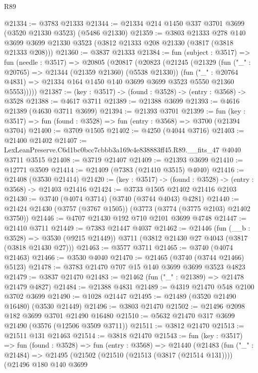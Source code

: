 \begin{lexlean}{R89}
\begin{coremodule}
@21334 := @3783 @21333
@21344 := @21334 @214 @1450 @337 @3701 @3699 (@3520 @21330 @3523) (@5486 @21330)
@21359 := @3803
    @21333
    @278
    @140
    @3699
    @3699
    @21330
    @3523
    (@3812 @21333 @208 @21330 (@3817 (@3818 @21333 @208)))
@21360 := @3837 @21333
@21384 := fun (subject : @3517) =>
  fun (needle : @3517) =>
  @20805
    (@20817
      (@20823
        (@21245
          (@21329
            (fun ("_" : @20765) => @21344 (@21359 @21360) (@5538 @21330))
            (fun ("_" : @20764 @4831) =>
            @21334 @164 @1450 @140 @3699 @3699 @3523 @5550 @21360 @5553)))))
@21387 := (key : @3517) -> (found : @3528) -> (entry : @3568) -> @3528
@21388 := @4617 @3711
@21389 := @21388 @3699
@21393 := @4616 @21389 (@4630 @3711 @3699)
@21394 := @21393 @3701
@21399 := fun (key : @3517) => fun (found : @3528) => fun (entry : @3568) => @3700 (@21394 @3704)
@21400 := @3709 @1505
@21402 := @4250 (@4044 @3716)
@21403 := @21400 @21402
@21407 := LexLeanPreserve.C6d1bc0bcc7cbbb3a169c4e838883ff45.R89.__fits_47 @4040 @3711 @3515
@21408 := @3719 @21407
@21409 := @21393 @3699
@21410 := @12771 @3509
@21414 := @21409 (@7383 (@21410 @3515) @4040)
@21416 := @21408 (@3530 @21414)
@21420 := (key : @3517) -> (found : @3528) -> (entry : @3568) -> @21403 @21416
@21424 := @3733 @1505 @21402 @21416 @2103
@21430 := @3740 (@4074 @3714) (@3740 (@3744 @4043) @4281)
@21440 := @21424 @21430 (@3757 (@3767 @1505)) (@3773 (@3774 (@3775 @2103) @21402 @3750))
@21446 := @4707 @21430 @192 @710 @2101 @3699 @4748
@21447 := @21410 @3711
@21449 := @7383 @21447 @4037
@21462 := @21446
    (fun (__b : @3528) => @3530 (@9215 @21449))
    @3711
    (@3812 @21430 @27 @4043 (@3817 (@3818 @21430 @27)))
@21463 := @3577 @3711
@21465 := @3740 (@4074 @21463)
@21466 := @3530 @4040
@21470 := @21465 (@3740 (@3744 @21466) @5123)
@21478 := @3783 @21470 @707 @15 @140 @3699 @3699 @3523 @4823
@21479 := @3837 @21470
@21483 := @21462 (fun ("_" : @21389) => @21478 @21479 @4827)
@21484 := @21388 @4831
@21489 := @4319 @21470 @548 @2100 @3702 @3699
@21490 := @1028 @21447
@21495 := @21489 (@3520 @21490 @16480) (@3530 @21449)
@21496 := @3803 @21470
@21502 := @21496 @2098 @182 @3699 @3701 @21490 @16480
@21510 := @5632 @21470 @317 @3699 @21490 (@3576 (@12506 @3509 @3711))
@21511 := @3812 @21470
@21513 := @21511 @131 @21463
@21514 := @3818 @21470
@21543 := fun (key : @3517) =>
  fun (found : @3528) =>
  fun (entry : @3568) =>
  @21440
    (@21483
      (fun ("_" : @21484) =>
      @21495
        (@21502
          (@21510 (@21513 (@3817 (@21514 @131))))
          (@21496
            @180
            @140
            @3699

\end{coremodule}
\end{lexlean}
